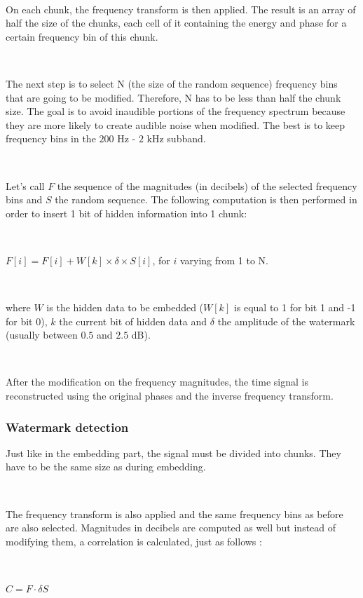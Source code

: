 ~

On each chunk, the frequency transform is then applied. The result is an array of half the size of the chunks, each cell of it containing the energy and phase for a certain frequency bin of this chunk.

~

The next step is to select N (the size of the random sequence) frequency bins that are going to be modified. Therefore, N has to be less than half the chunk size. The goal is to avoid inaudible portions of the frequency spectrum because they are more likely to create audible noise when modified. The best is to keep frequency bins in the $200$ Hz - $2$ kHz subband.

~

Let's call $F$ the sequence of the magnitudes (in decibels) of the selected frequency bins and $S$ the random sequence. The following computation is then performed in order to insert 1 bit of hidden information into 1 chunk:

~

$F[i] = F[i] + W[k] \times \delta \times S[i]$, for $i$ varying from 1 to N.

~

\noindent where $W$ is the hidden data to be embedded ($W[k]$ is equal to 1 for bit 1 and -1 for bit 0), $k$ the current bit of hidden data and $\delta$ the amplitude of the watermark (usually between $0.5$ and $2.5$ dB).

~

After the modification on the frequency magnitudes, the time signal is reconstructed using the original phases and the inverse frequency transform.

\subsubsection{Watermark detection}

Just like in the embedding part, the signal must be divided into chunks. They have to be the same size as during embedding.

~

The frequency transform is also applied and the same frequency bins as before are also selected. Magnitudes in decibels are computed as well but instead of modifying them, a correlation is calculated, just as follows :

~

$C = F \cdot \delta S$

~

